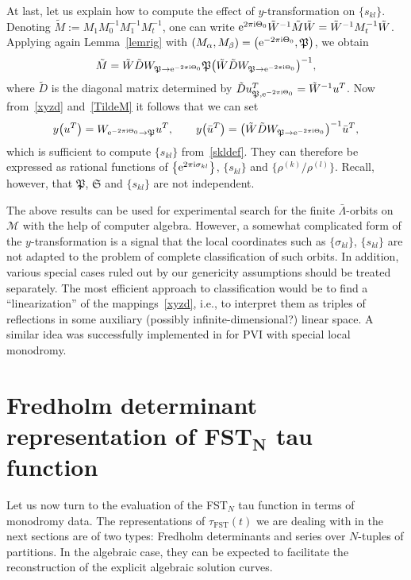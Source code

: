 \documentclass[pdftex]{sigma}
\numberwithin{equation}{section}
\begin{document}
At last, let us explain how to compute the effect of $y$-transformation on $\{s_{kl}\}$. Denoting $\tilde M:= M_1 M_0^{-1}M_1^{-1}M_t^{-1}$, one can write ${\rm e}^{2\pi{\rm i}\Theta_0} \tilde W^{-1} \tilde{M}
\tilde W=\tilde W^{-1} M_t^{-1}\tilde W$. Applying again Lemma~\ref{lemrig} with $(M_{\alpha},M_{\beta})=\big( {\rm e}^{-2\pi{\rm i} \Theta_0},\mathfrak P\big)$, we obtain
\begin{gather}\label{TildeM}
\tilde M=\tilde W\tilde D W_{\mathfrak P\to {\rm e}^{-2\pi{\rm i} \Theta_0}}\mathfrak P \bigl(\tilde W\tilde D W_{\mathfrak P\to {\rm e}^{-2\pi{\rm i} \Theta_0}}\bigr)^{-1},
\end{gather}
where $\tilde D$ is the diagonal matrix determined by
$ \tilde D u^T_{\mathfrak P, {\rm e}^{-2\pi{\rm i} \Theta_0}}=\tilde{W}^{-1}u^T$. Now from~\eqref{xyzd} and~\eqref{TildeM} it follows that we can set
\begin{gather*}
y\big(u^T\big)= W_{ {\rm e}^{-2\pi{\rm i} \Theta_0}\to \mathfrak P}u^T,\qquad y\big(\bar u^T\big)=\bigl(\tilde W\tilde D W_{\mathfrak P\to {\rm e}^{-2\pi{\rm i} \Theta_0}}\bigr)^{-1}\bar u^T,
\end{gather*}
which is sufficient to compute $ \{s_{kl} \}$ from~\eqref{skldef}. They can therefore be expressed as rational functions of $\big\{{\rm e}^{2\pi{\rm i} \sigma_{kl}}\big\}$, $ \{s_{kl} \}$ and $\big\{\rho^{(k)}\bigl/\rho^{(l)}\big\}$. Recall, however, that $\mathfrak P$, $\mathfrak S$ and $ \{s_{kl} \}$ are not independent.

The above results can be used for experimental search for the finite $\bar\Lambda$-orbits on $\mathcal M$ with the help of computer algebra. However, a somewhat complicated form of the $y$-transformation is a signal that the local coordinates such as $\{\sigma_{kl}\}$, $\{s_{kl}\}$ are not adapted to the problem of complete classification of such orbits. In addition, various special cases ruled out by our genericity assumptions should be treated separately. The most efficient approach to classification would be to find a ``linearization'' of the mappings~\eqref{xyzd}, i.e., to interpret them as triples of reflections in some auxiliary (possibly infinite-dimensional?) linear space. A similar idea was successfully implemented in \cite{DM} for PVI with special local monodromy.

\section[Fredholm determinant representation of FST$_N$ tau function]{Fredholm determinant representation of FST$\boldsymbol{_N}$ tau function}\label{secdet}
Let us now turn to the evaluation of the FST$_N$ tau function in terms of monodromy data. The representations of $\tau_{\mathrm{FST}}(t)$ we are dealing with in the next sections are of two types: Fredholm determinants and series over $N$-tuples of partitions. In the algebraic case, they can be expected to facilitate the reconstruction of the explicit algebraic solution curves.
\end{document}
